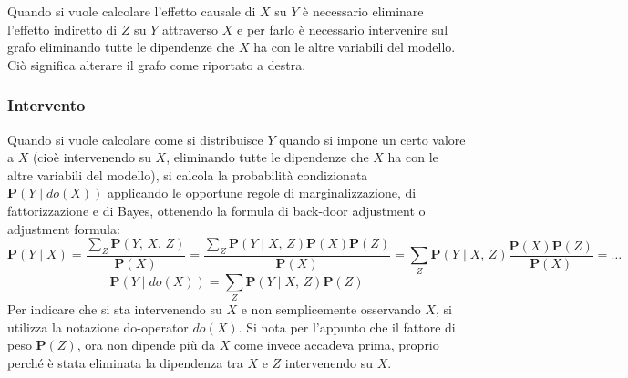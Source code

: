 \begin{center}
	\begin{minipage}{0.68\textwidth}
		Quando si vuole calcolare l'effetto causale di \(X\) su \(Y\) è necessario eliminare l'effetto indiretto di \(Z\) su \(Y\)
		attraverso \(X\) e per farlo è necessario intervenire sul grafo eliminando tutte le dipendenze che \(X\) ha con le altre
		variabili del modello. Ciò significa alterare il grafo come riportato a destra.
	\end{minipage}
	\begin{minipage}{0.3\textwidth}
		\centering
	\end{minipage}
\end{center}

\subsubsection*{Intervento}
Quando si vuole calcolare come si distribuisce \(Y\) quando si impone un certo valore a \(X\) (cioè intervenendo su \(X\),
eliminando tutte le dipendenze che \(X\) ha con le altre variabili del modello), si calcola la probabilità condizionata
\(\textbf{P}(Y \mid do(X))\) applicando le opportune regole di marginalizzazione, di fattorizzazione e di Bayes, ottenendo
la formula di back-door adjustment o adjustment formula:
\[\textbf{P}(Y \mid X) = \frac{\sum_{Z} \textbf{P}(Y, \, X, \, Z)}{\textbf{P}(X)} = \frac{\sum_{Z} \textbf{P}(Y \mid X, \, Z) \textbf{P}(X) \textbf{P}(Z)}{\textbf{P}(X)} = \sum_{Z} \textbf{P}(Y \mid X, \, Z) \frac{\textbf{P}(X) \textbf{P}(Z)}{\textbf{P}(X)} = \dots\]
\[\textbf{P}(Y \mid do(X)) = \sum_{Z} \textbf{P}(Y \mid X, \, Z) \textbf{P}(Z)\]
Per indicare che si sta intervenendo su \(X\) e non semplicemente osservando \(X\), si utilizza la notazione do-operator
\(do(X)\). Si nota per l'appunto che il fattore di peso \(\textbf{P}(Z)\), ora non dipende più da \(X\) come invece accadeva
prima, proprio perché è stata eliminata la dipendenza tra \(X\) e \(Z\) intervenendo su \(X\).

